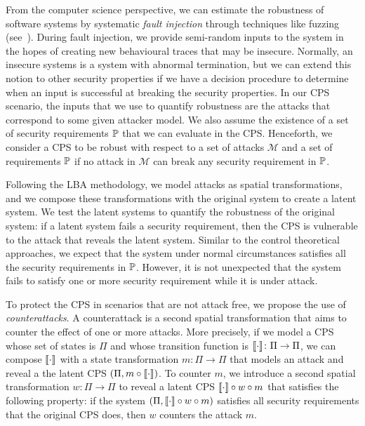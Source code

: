 {From the computer science perspective, we can estimate the robustness of software systems by systematic \emph{fault injection} through techniques like fuzzing (see~\cite{Fuzzing}).  
During fault injection, we provide semi-random inputs to the system in the hopes of creating new behavioural traces that may be insecure.  %
Normally, an insecure systems is a system with abnormal termination, but we can extend this notion to other security properties if we have a decision procedure to determine when an input is successful at breaking the security properties. In our CPS scenario, the inputs that we use to quantify robustness are the attacks that correspond to some given attacker model. We also assume the existence of a set of security requirements $\mathbb{P}$ that we can evaluate in the CPS. Henceforth, we consider a CPS to be robust with respect to a set of attacks $\mathcal{M}$ and a set of requirements $\mathbb{P}$ if no attack in $\mathcal{M}$ can break any security requirement in $\mathbb{P}$. 

Following the LBA methodology, we model attacks as spatial transformations, and we compose these transformations with the original system to create a latent system. We test the latent systems to quantify the robustness of the original system: if a latent system fails a security requirement, then the CPS is vulnerable to the attack that reveals the latent system. Similar to the control theoretical approaches, we expect that the system under normal circumstances satisfies all the security requirements in $\mathbb{P}$. However, it is not unexpected that the system fails to satisfy one or more security requirement while it is under attack. 

To protect the CPS in scenarios that are not attack free, we propose the use of \emph{counterattacks}. A counterattack is a second spatial transformation that aims to counter the effect of one or more attacks. More precisely, if we model a CPS whose set of states is $\Pi$ and whose transition function is ${{{\llbracket\cdot\rrbracket}}}\colon\Pi\rightarrow\Pi$, we can compose ${{{\llbracket\cdot\rrbracket}}}$ with a state transformation $m\colon \Pi\rightarrow\Pi$ that models an attack and reveal a the latent CPS $(\Pi,m\circ {{{\llbracket\cdot\rrbracket}}})$. To counter $m$, we introduce a second spatial transformation $w\colon \Pi\rightarrow \Pi$ to reveal a latent CPS ${{{\llbracket\cdot\rrbracket}}}\circ w\circ m$ that satisfies the following property: if the system $(\Pi,{{{\llbracket\cdot\rrbracket}}}\circ w\circ m)$ satisfies all security requirements that the original CPS does, then $w$ counters the attack $m$.

}
